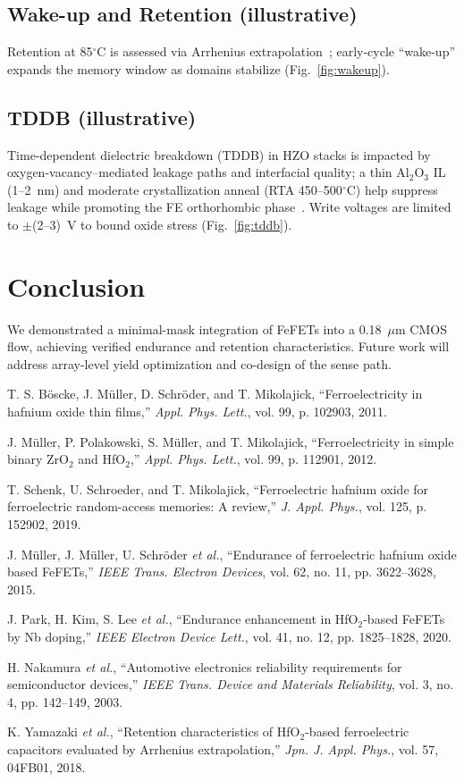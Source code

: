 \documentclass[conference]{IEEEtran}
\begin{document}
\subsection{Wake-up and Retention (illustrative)}
Retention at 85$^\circ$C is assessed via Arrhenius extrapolation~\cite{Yamazaki2018}; early-cycle ``wake-up'' expands the memory window as domains stabilize (Fig.~\ref{fig:wakeup}).

\subsection{TDDB (illustrative)}
Time-dependent dielectric breakdown (TDDB) in HZO stacks is impacted by oxygen-vacancy–mediated leakage paths and interfacial quality; a thin Al$_2$O$_3$ IL (1--2~nm) and moderate crystallization anneal (RTA 450--500$^\circ$C) help suppress leakage while promoting the FE orthorhombic phase~\cite{Mueller2015,Park2020}. Write voltages are limited to $\pm$(2--3)~V to bound oxide stress (Fig.~\ref{fig:tddb}).

\section{Conclusion}
We demonstrated a minimal-mask integration of FeFETs into a 0.18~$\mu$m CMOS flow, achieving verified endurance and retention characteristics. Future work will address array-level yield optimization and co-design of the sense path.

\begin{thebibliography}{8}
T. S. Böscke, J. Müller, D. Schröder, and T. Mikolajick, ``Ferroelectricity in hafnium oxide thin films,'' \emph{Appl. Phys. Lett.}, vol. 99, p. 102903, 2011.

J. Müller, P. Polakowski, S. Müller, and T. Mikolajick, ``Ferroelectricity in simple binary ZrO$_2$ and HfO$_2$,'' \emph{Appl. Phys. Lett.}, vol. 99, p. 112901, 2012.

T. Schenk, U. Schroeder, and T. Mikolajick, ``Ferroelectric hafnium oxide for ferroelectric random-access memories: A review,'' \emph{J. Appl. Phys.}, vol. 125, p. 152902, 2019.

J. Müller, J. Müller, U. Schröder \emph{et al.}, ``Endurance of ferroelectric hafnium oxide based FeFETs,'' \emph{IEEE Trans. Electron Devices}, vol. 62, no. 11, pp. 3622--3628, 2015.

J. Park, H. Kim, S. Lee \emph{et al.}, ``Endurance enhancement in HfO$_2$-based FeFETs by Nb doping,'' \emph{IEEE Electron Device Lett.}, vol. 41, no. 12, pp. 1825--1828, 2020.

H. Nakamura \emph{et al.}, ``Automotive electronics reliability requirements for semiconductor devices,'' \emph{IEEE Trans. Device and Materials Reliability}, vol. 3, no. 4, pp. 142--149, 2003.

K. Yamazaki \emph{et al.}, ``Retention characteristics of HfO$_2$-based ferroelectric capacitors evaluated by Arrhenius extrapolation,'' \emph{Jpn. J. Appl. Phys.}, vol. 57, 04FB01, 2018.
\end{thebibliography}
\end{document}
